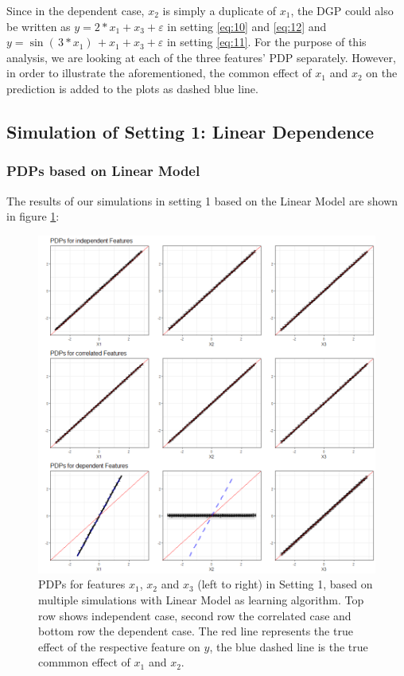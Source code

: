 \documentclass[]{krantz}
\begin{document}
Since in the dependent case, \(x_2\) is simply a duplicate of \(x_1\),
the DGP could also be written as \(y = 2*x_1 + x_3 + \varepsilon\) in
setting \eqref{eq:10} and \eqref{eq:12} and
\(y = \sin{( \, 3*x_1 ) \,} + x_1 + x_3 + \varepsilon\) in setting
\eqref{eq:11}. For the purpose of this analysis, we are looking at each of
the three features' PDP separately. However, in order to illustrate the
aforementioned, the common effect of \(x_1\) and \(x_2\) on the
prediction is added to the plots as dashed blue line.

\subsection{Simulation of Setting 1: Linear
Dependence}\label{simulation-of-setting-1-linear-dependence}

\subsubsection{PDPs based on Linear
Model}\label{pdps-based-on-linear-model}

The results of our simulations in setting 1 based on the Linear Model
are shown in figure \ref{fig:Figure14}:

\begin{figure}

\includegraphics[width=1\linewidth]{images/VK_PDP_14_Set1_LM} \hfill{}

\caption{PDPs for features $x_1$, $x_2$ and $x_3$ (left to right) in Setting 1, based on multiple simulations with Linear Model as learning algorithm. Top row shows independent case, second row the correlated case and bottom row the dependent case. The red line represents the true effect of the respective feature on $y$, the blue dashed line is the true commmon effect of $x_1$ and $x_2$.}\label{fig:Figure14}
\end{figure}
\end{document}
